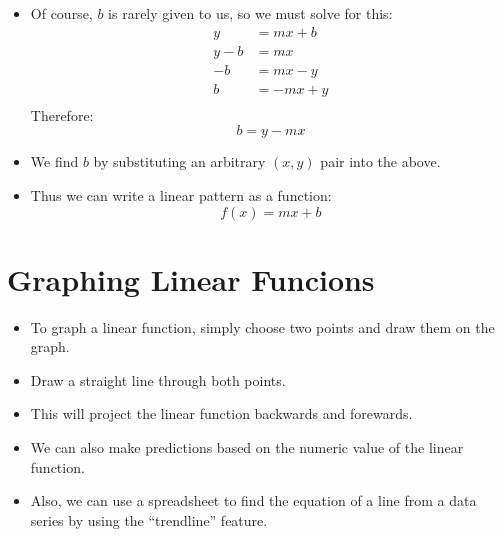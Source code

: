 \documentclass{article}
\begin{document}
\begin{itemize}
    \item Of course, $b$ is rarely given to us, so we must solve for this:
        \begin{align*}
            y &= mx + b\\
            y - b &= mx \\
            -b &= mx - y \\
            b &= -mx + y \\
        \end{align*}
        Therefore:
        \[
            \boxed{b = y - mx}
        \]
    \item We find $b$ by substituting an arbitrary $(x,y)$ pair into the above.
    \item Thus we can write a linear pattern as a function:
    \[
        \boxed{f(x) = mx + b}
    \]
\end{itemize}

\section*{Graphing Linear Funcions}
\begin{itemize}
    \item To graph a linear function, simply choose two points and draw them on
        the graph.
    \item Draw a straight line through both points.
    \item This will project the linear function backwards and forewards.
    \item We can also make predictions based on the numeric value of the linear
        function.
    \item Also, we can use a spreadsheet to find the equation of a line from
        a data series by using the ``trendline'' feature.
\end{itemize}
\end{document}
